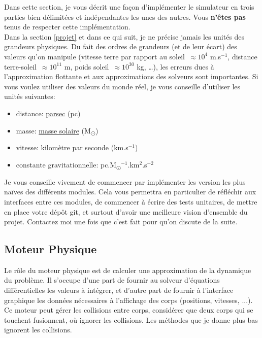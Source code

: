 \documentclass{article}
\begin{document}
Dans cette section, je vous décrit une façon d'implémenter le simulateur en trois parties bien délimitées et indépendantes les unes des autres. Vous \textbf{n'êtes pas} tenus de respecter cette implémentation. \\
Dans la section \ref{projet} et dans ce qui suit, je ne précise jamais les unités des grandeurs physiques. Du fait des ordres de grandeurs (et de leur écart) des valeurs qu'on manipule (vitesse terre par rapport au soleil~${\approx 10^4}$ m.s$^{-1}$, distance terre-soleil~${\approx 10^{11}}$ m, poids soleil~${\approx 10^{30}}$ kg, \dots), les erreurs dues à l'approximation flottante et aux approximations des solveurs sont importantes. Si vous voulez utiliser des valeurs du monde réel, je vous conseille d'utiliser les unités suivantes:
\begin{itemize}
    \item distance: \href{https://en.wikipedia.org/wiki/Parsec}{parsec} (pc)
    \item masse: \href{https://en.wikipedia.org/wiki/Solar_mass}{masse solaire} (M\textsubscript{\(\odot\)})
    \item vitesse: kilomètre par seconde (km.s$^{-1}$)
    \item constante gravitationnelle: pc.M\textsubscript{\(\odot\)}$^{-1}$.km$^2$.s$^{-2}$
\end{itemize}

Je vous conseille vivement de commencer par implémenter les version les plus naïves des différents modules. Cela vous permettra en particulier de réfléchir aux interfaces entre ces modules, de commencer à écrire des tests unitaires, de mettre en place votre dépôt git, et surtout d'avoir une meilleure vision d'ensemble du projet. Contactez moi une fois que c'est fait pour qu'on discute de la suite.

\subsection{Moteur Physique}
\label{moteurphysique}

Le rôle du moteur physique est de calculer une approximation de la dynamique du problème. Il s'occupe d'une part de fournir au solveur d'équations différentielles les valeurs à intégrer, et d'autre part de fournir à l'interface graphique les données nécessaires à l'affichage des corps (positions, vitesses, ...). \\
Ce moteur peut gérer les collisions entre corps, considérer que deux corps qui se touchent fusionnent, où ignorer les collisions. Les méthodes que je donne plus bas ignorent les collisions.
\end{document}
